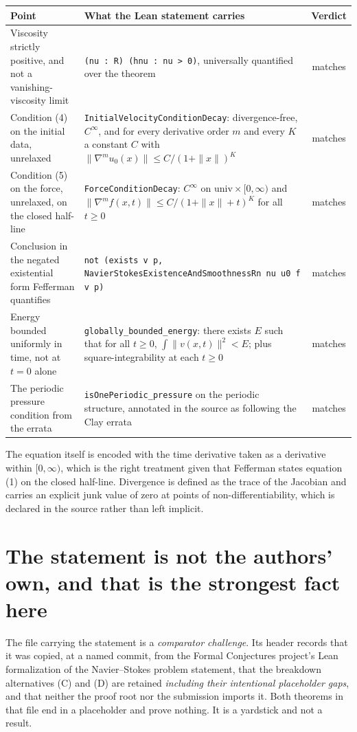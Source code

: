 \begin{center}
\begin{tabular}{@{}p{}p{}c@{}}
\toprule
Point & What the Lean statement carries & Verdict \\
\midrule
Viscosity strictly positive, and not a vanishing-viscosity limit
& \texttt{(nu : R) (hnu : nu > 0)}, universally quantified over the theorem
& matches \\[0.5em]
Condition (4) on the initial data, unrelaxed
& \texttt{InitialVelocityConditionDecay}: divergence-free, $C^\infty$, and for every derivative
order $m$ and every $K$ a constant $C$ with
$\|\nabla^m u_0(x)\| \le C/(1+\|x\|)^K$
& matches \\[0.5em]
Condition (5) on the force, unrelaxed, on the closed half-line
& \texttt{ForceConditionDecay}: $C^\infty$ on $\mathrm{univ}\times[0,\infty)$ and
$\|\nabla^m f(x,t)\| \le C/(1+\|x\|+t)^K$ for all $t\ge0$
& matches \\[0.5em]
Conclusion in the negated existential form Fefferman quantifies
& \texttt{not (exists v p, NavierStokesExistence\-AndSmoothnessRn nu u0 f v p)}
& matches \\[0.5em]
Energy bounded uniformly in time, not at $t=0$ alone
& \texttt{globally\_bounded\_energy}: there exists $E$ such that for all $t\ge0$,
$\int\|v(x,t)\|^2 < E$; plus square-integrability at each $t\ge0$
& matches \\[0.5em]
The periodic pressure condition from the errata
& \texttt{isOnePeriodic\_pressure} on the periodic structure, annotated in the source as following
the Clay errata
& matches \\
\bottomrule
\end{tabular}
\end{center}

The equation itself is encoded with the time derivative taken as a derivative within
$[0,\infty)$, which is the right treatment given that Fefferman states equation (1) on the closed
half-line. Divergence is defined as the trace of the Jacobian and carries an explicit junk value of
zero at points of non-differentiability, which is declared in the source rather than left implicit.

\section{The statement is not the authors' own, and that is the strongest fact here}

The file carrying the statement is a \emph{comparator challenge}. Its header records that it was
copied, at a named commit, from the Formal Conjectures project's Lean formalization of the
Navier--Stokes problem statement, that the breakdown alternatives (C) and (D) are retained
\emph{including their intentional placeholder gaps}, and that neither the proof root nor the
submission imports it. Both theorems in that file end in a placeholder and prove nothing. It is a
yardstick and not a result.

